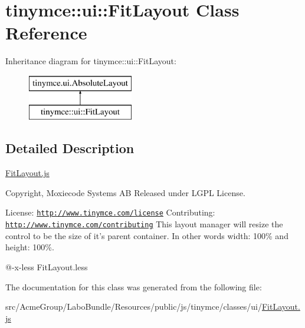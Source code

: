 \hypertarget{classtinymce_1_1ui_1_1_fit_layout}{\section{tinymce\+:\+:ui\+:\+:Fit\+Layout Class Reference}
\label{classtinymce_1_1ui_1_1_fit_layout}
}
Inheritance diagram for tinymce\+:\+:ui\+:\+:Fit\+Layout\+:\begin{figure}[H]
\begin{center}
\leavevmode
\includegraphics[height=2.000000cm]{classtinymce_1_1ui_1_1_fit_layout}
\end{center}
\end{figure}


\subsection{Detailed Description}
\hyperlink{_fit_layout_8js}{Fit\+Layout.\+js}

Copyright, Moxiecode Systems A\+B Released under L\+G\+P\+L License.

License\+: \href{http://www.tinymce.com/license}{\tt http\+://www.\+tinymce.\+com/license} Contributing\+: \href{http://www.tinymce.com/contributing}{\tt http\+://www.\+tinymce.\+com/contributing} This layout manager will resize the control to be the size of it's parent container. In other words width\+: 100\% and height\+: 100\%.

@-\/x-\/less Fit\+Layout.\+less 

The documentation for this class was generated from the following file\+:\begin{DoxyCompactItemize}
\item 
src/\+Acme\+Group/\+Labo\+Bundle/\+Resources/public/js/tinymce/classes/ui/\hyperlink{_fit_layout_8js}{Fit\+Layout.\+js}\end{DoxyCompactItemize}
